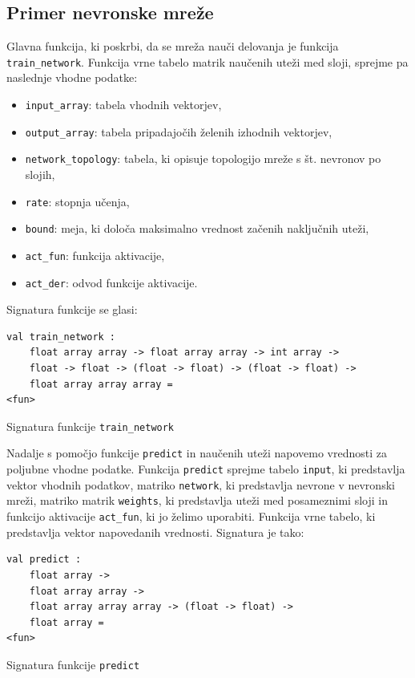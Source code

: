 \documentclass[mat1]{fmfdelo}
\begin{document}
\subsection{Primer nevronske mreže}
Glavna funkcija, ki poskrbi, da se mreža nauči delovanja je funkcija  \texttt{train\_network}. Funkcija vrne tabelo matrik naučenih uteži med sloji, sprejme pa naslednje vhodne podatke:
\begin{itemize}
	\item \texttt{input\_array}: tabela vhodnih vektorjev,
	\item \texttt{output\_array}: tabela pripadajočih želenih izhodnih vektorjev,
	\item \texttt{network\_topology}: tabela, ki opisuje topologijo mreže s št. nevronov po slojih,
	\item \texttt{rate}: stopnja učenja,
	\item \texttt{bound}: meja, ki določa maksimalno vrednost začenih naključnih uteži,
	\item \texttt{act\_fun}: funkcija aktivacije,
	\item \texttt{act\_der}: odvod funkcije aktivacije.
\end{itemize}
%
Signatura funkcije se glasi:
%
\begin{listing}[!h]
	\begin{verbatim}
val train_network :
	float array array -> float array array -> int array -> 
	float -> float -> (float -> float) -> (float -> float) -> 
	float array array array =
<fun>
	\end{verbatim} 
	\caption{Signatura funkcije \texttt{train\_network}}
	\label{signatura}
\end{listing}

Nadalje s pomočjo funkcije \texttt{predict} in naučenih uteži napovemo vrednosti za poljubne vhodne podatke. Funkcija \texttt{predict} sprejme tabelo \texttt{input}, ki predstavlja vektor vhodnih podatkov, matriko \texttt{network}, ki predstavlja nevrone v nevronski mreži, matriko matrik \texttt{weights}, ki predstavlja uteži med posameznimi sloji in funkcijo aktivacije \texttt{act\_fun}, ki jo želimo uporabiti. Funkcija vrne tabelo, ki predstavlja vektor napovedanih vrednosti. Signatura je tako:
%
\begin{listing}[!h]
	\begin{verbatim}
val predict :
	float array ->
	float array array ->
	float array array array -> (float -> float) -> 
	float array = 
<fun>
	\end{verbatim} 
	\caption{Signatura funkcije \texttt{predict}}
	\label{signatura2}
\end{listing}
%
\end{document}
